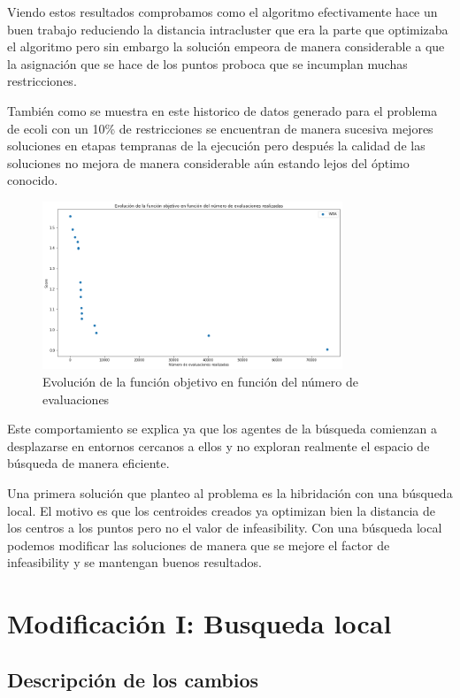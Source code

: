 \documentclass[11pt]{article}
\begin{document}
Viendo estos resultados comprobamos como el algoritmo efectivamente hace un buen
trabajo reduciendo la distancia intracluster que era la parte que optimizaba el
algoritmo pero sin embargo la solución empeora de manera considerable a que la
asignación que se hace de los puntos proboca que se incumplan muchas restricciones.

También como se muestra en este historico de datos generado para el problema de
ecoli con un 10\% de restricciones se encuentran de manera sucesiva mejores
soluciones en etapas tempranas de la ejecución pero después la calidad de las
soluciones no mejora de manera considerable aún estando lejos del óptimo conocido. 

\begin{figure}[H]
  \centering
  \includegraphics[width=0.8\textwidth]{images/evolution}
  \caption{Evolución de la función objetivo en función del número de evaluaciones}
\end{figure}
  

Este comportamiento se explica ya que los agentes de la búsqueda comienzan a
desplazarse en entornos cercanos a ellos y no exploran realmente el espacio de
búsqueda de manera eficiente. 

Una primera solución que planteo al problema es la hibridación con una búsqueda
local. El motivo es que los centroides creados ya optimizan bien la distancia de
los centros a los puntos pero no el valor de infeasibility. Con una búsqueda
local podemos modificar las soluciones de manera que se mejore el factor de
infeasibility y se mantengan buenos resultados.

\section{Modificación I: Busqueda local}

\subsection{Descripción de los cambios}
\end{document}
